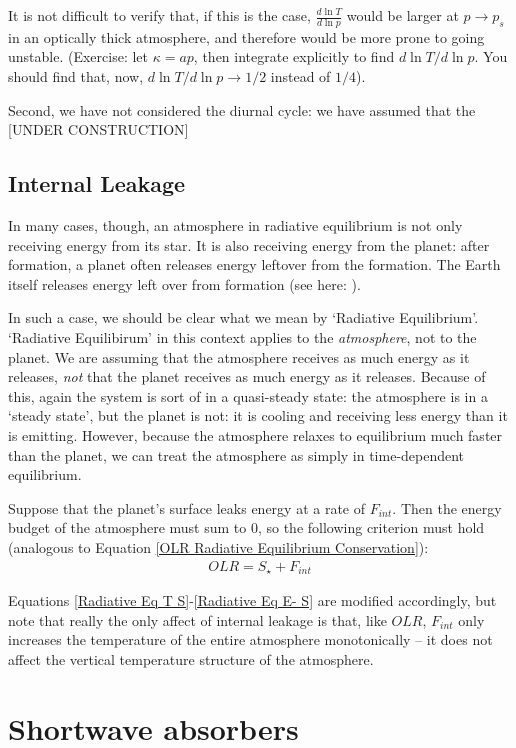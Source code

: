 It is not difficult to verify that, if this is the case, $\frac{d\ln T}{d\ln p}$ would be larger at $p\to p_s$ in an optically thick atmosphere, and therefore would be more prone to going unstable. (Exercise: let $\kappa = a p$, then integrate explicitly to find $d\ln T/d\ln p$. You should find that, now, $d\ln T/d\ln p \to 1/2$ instead of $1/4$).

Second, we have not considered the diurnal cycle: we have assumed that the 
[UNDER CONSTRUCTION]

\subsection{Internal Leakage}

In many cases, though, an atmosphere in radiative equilibrium is not only receiving energy from its star. It is also receiving energy from the planet: after formation, a planet often releases energy leftover from the formation. The Earth itself releases energy left over from formation (see here: \cite{EarthEnergy}). 

In such a case, we should be clear what we mean by `Radiative Equilibrium'. `Radiative Equilibirum' in this context applies to the \textit{atmosphere}, not to the planet. We are assuming that the atmosphere receives as much energy as it releases, \textit{not} that the planet receives as much energy as it releases. Because of this, again the system is sort of in a quasi-steady state: the atmosphere is in a `steady state', but the planet is not: it is cooling and receiving less energy than it is emitting. However, because the atmosphere relaxes to equilibrium much faster than the planet, we can treat the atmosphere as simply in time-dependent equilibrium.

Suppose that the planet's surface leaks energy at a rate of $F_{int}$. Then the energy budget of the atmosphere must sum to $0$, so the following criterion must hold (analogous to Equation \ref{OLR Radiative Equilibrium Conservation}):
\begin{align*}
    OLR = S_\star + F_{int}
\end{align*}

Equations \ref{Radiative Eq T S}-\ref{Radiative Eq E- S} are modified accordingly, but note that really the only affect of internal leakage is that, like $OLR$, $F_{int}$ only increases the temperature of the entire atmosphere monotonically – it does not affect the vertical temperature structure of the atmosphere. 

\section{Shortwave absorbers}\label{Shortwave}

